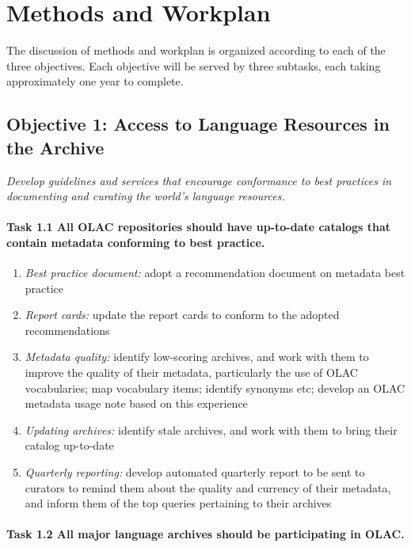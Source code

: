 \section{Methods and Workplan}

The discussion of methods and workplan is organized according to
each of the three objectives.  Each objective will be served by
three subtasks, each taking approximately one year to complete.


\subsection*{Objective 1: Access to Language Resources in the Archive}

\emph{Develop guidelines and services that encourage conformance to best
practices in documenting and curating the world's language resources.}

\def\task{1.1}
\paragraph{Task {\task} All OLAC repositories should have up-to-date catalogs
      that contain metadata conforming to best practice.}

\begin{enumerate}[label=\emph{\task\alph*}]
\item \emph{Best practice document:}
  adopt a recommendation document on metadata best practice
\item \emph{Report cards:}
  update the report cards to conform to the adopted recommendations
\item \emph{Metadata quality:}
  identify low-scoring archives, and work with them to
  improve the quality of their metadata, particularly the
  use of OLAC vocabularies; map vocabulary items; identify synonyms etc;
  develop an OLAC metadata usage note based on this experience
\item \emph{Updating archives:}
  identify stale archives, and work with them to bring their 
  catalog up-to-date
\item \emph{Quarterly reporting:}
  develop automated quarterly report to be sent to curators to 
  remind them about the quality and currency of their metadata, and 
  inform them of the top queries pertaining to their archives
\end{enumerate}

\def\task{1.2}
\paragraph{Task {\task} All major language archives should be participating in OLAC.}

